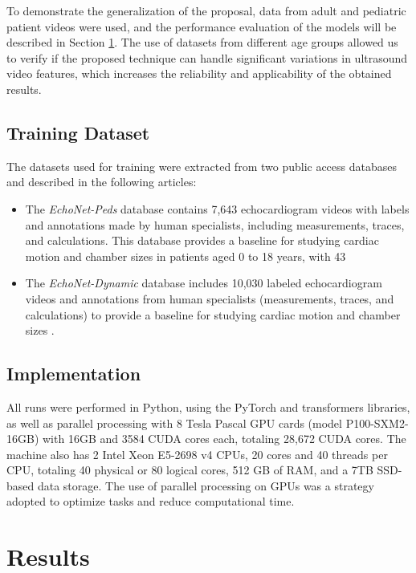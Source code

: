 \documentclass[a4paper,fleqn]{cas-dc}
\begin{document}
To demonstrate the generalization of the proposal, data from adult and pediatric patient videos were used, and the performance evaluation of the models will be described in Section \ref{sec:4}. The use of datasets from different age groups allowed us to verify if the proposed technique can handle significant variations in ultrasound video features, which increases the reliability and applicability of the obtained results.

\subsection{Training Dataset} \label{sub:Training Dataset}

The datasets used for training were extracted from two public access databases and described in the following articles:

\begin{itemize}
\item The \textit{EchoNet-Peds} database contains 7,643 echocardiogram videos with labels and annotations made by human specialists, including measurements, traces, and calculations. This database provides a baseline for studying cardiac motion and chamber sizes in patients aged 0 to 18 years, with 43%
\item The \textit{EchoNet-Dynamic} database includes 10,030 labeled echocardiogram videos and annotations from human specialists (measurements, traces, and calculations) to provide a baseline for studying cardiac motion and chamber sizes \cite{Ouyang2019}.
\end{itemize}

\subsection{Implementation} \label{sub:Implementation}

All runs were performed in Python, using the PyTorch and transformers libraries, as well as parallel processing with 8 Tesla Pascal GPU cards (model P100-SXM2-16GB) with 16GB and 3584 CUDA cores each, totaling 28,672 CUDA cores. The machine also has 2 Intel Xeon E5-2698 v4 CPUs, 20 cores and 40 threads per CPU, totaling 40 physical or 80 logical cores, 512 GB of RAM, and a 7TB SSD-based data storage. The use of parallel processing on GPUs was a strategy adopted to optimize tasks and reduce computational time.

\section{Results} \label{sec:4}
\end{document}
